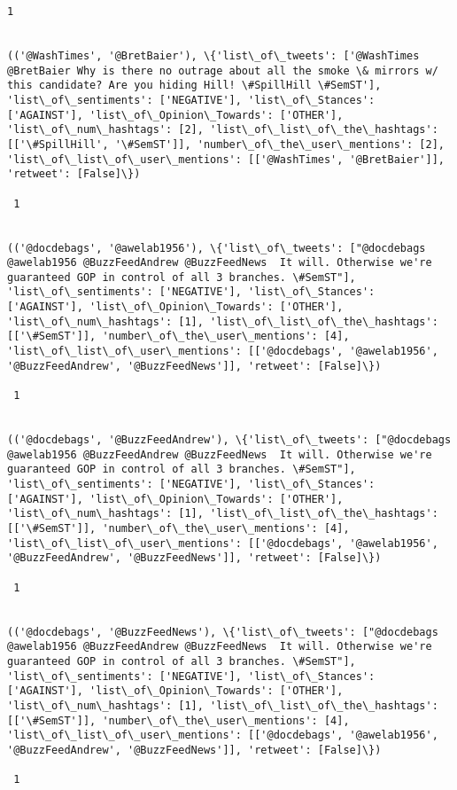 \documentclass[11pt]{article}
\begin{document}
\begin{Verbatim}[commandchars=\\\{\}]
 1
 

(('@WashTimes', '@BretBaier'), \{'list\_of\_tweets': ['@WashTimes @BretBaier Why is there no outrage about all the smoke \& mirrors w/ this candidate? Are you hiding Hill! \#SpillHill \#SemST'], 'list\_of\_sentiments': ['NEGATIVE'], 'list\_of\_Stances': ['AGAINST'], 'list\_of\_Opinion\_Towards': ['OTHER'], 'list\_of\_num\_hashtags': [2], 'list\_of\_list\_of\_the\_hashtags': [['\#SpillHill', '\#SemST']], 'number\_of\_the\_user\_mentions': [2], 'list\_of\_list\_of\_user\_mentions': [['@WashTimes', '@BretBaier']], 'retweet': [False]\})

 1
 

(('@docdebags', '@awelab1956'), \{'list\_of\_tweets': ["@docdebags @awelab1956 @BuzzFeedAndrew @BuzzFeedNews  It will. Otherwise we're guaranteed GOP in control of all 3 branches. \#SemST"], 'list\_of\_sentiments': ['NEGATIVE'], 'list\_of\_Stances': ['AGAINST'], 'list\_of\_Opinion\_Towards': ['OTHER'], 'list\_of\_num\_hashtags': [1], 'list\_of\_list\_of\_the\_hashtags': [['\#SemST']], 'number\_of\_the\_user\_mentions': [4], 'list\_of\_list\_of\_user\_mentions': [['@docdebags', '@awelab1956', '@BuzzFeedAndrew', '@BuzzFeedNews']], 'retweet': [False]\})

 1
 

(('@docdebags', '@BuzzFeedAndrew'), \{'list\_of\_tweets': ["@docdebags @awelab1956 @BuzzFeedAndrew @BuzzFeedNews  It will. Otherwise we're guaranteed GOP in control of all 3 branches. \#SemST"], 'list\_of\_sentiments': ['NEGATIVE'], 'list\_of\_Stances': ['AGAINST'], 'list\_of\_Opinion\_Towards': ['OTHER'], 'list\_of\_num\_hashtags': [1], 'list\_of\_list\_of\_the\_hashtags': [['\#SemST']], 'number\_of\_the\_user\_mentions': [4], 'list\_of\_list\_of\_user\_mentions': [['@docdebags', '@awelab1956', '@BuzzFeedAndrew', '@BuzzFeedNews']], 'retweet': [False]\})

 1
 

(('@docdebags', '@BuzzFeedNews'), \{'list\_of\_tweets': ["@docdebags @awelab1956 @BuzzFeedAndrew @BuzzFeedNews  It will. Otherwise we're guaranteed GOP in control of all 3 branches. \#SemST"], 'list\_of\_sentiments': ['NEGATIVE'], 'list\_of\_Stances': ['AGAINST'], 'list\_of\_Opinion\_Towards': ['OTHER'], 'list\_of\_num\_hashtags': [1], 'list\_of\_list\_of\_the\_hashtags': [['\#SemST']], 'number\_of\_the\_user\_mentions': [4], 'list\_of\_list\_of\_user\_mentions': [['@docdebags', '@awelab1956', '@BuzzFeedAndrew', '@BuzzFeedNews']], 'retweet': [False]\})

 1
 


\end{Verbatim}
\end{document}
